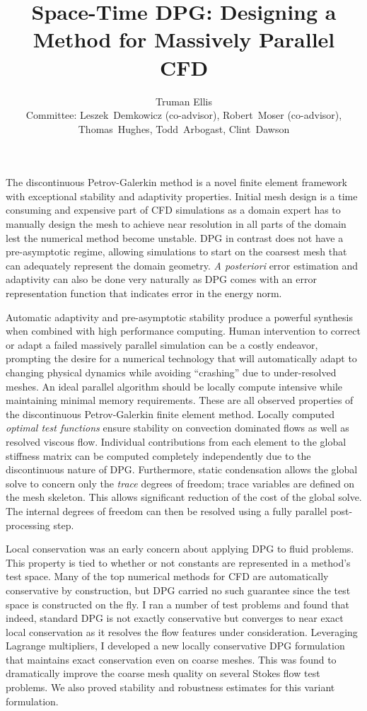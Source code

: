 \documentclass[letterpaper]{article}
\title{Space-Time DPG: Designing a Method for Massively Parallel CFD}
\author{Truman Ellis\\
Committee: Leszek~Demkowicz (co-advisor), Robert~Moser (co-advisor), Thomas~Hughes, Todd~Arbogast, Clint~Dawson}
\date{}
\begin{document}
\maketitle

The discontinuous Petrov-Galerkin method\cite{DPGOverview} is a novel finite element framework with exceptional stability and adaptivity properties.
Initial mesh design is a time consuming and expensive part of CFD simulations as a domain expert has to manually design the 
mesh to achieve near resolution in all parts of the domain lest the numerical method become unstable.
DPG in contrast does not have a pre-asymptotic regime, allowing simulations to start on the coarsest mesh that can adequately represent the domain geometry.
\emph{A posteriori} error estimation and adaptivity can also be done very naturally as DPG comes with an error representation function 
that indicates error in the energy norm.

Automatic adaptivity and pre-asymptotic stability produce a powerful synthesis when combined with high performance computing.
Human intervention to correct or adapt a failed massively parallel simulation can be a costly endeavor, prompting the desire for a
numerical technology that will automatically adapt to changing physical dynamics while avoiding ``crashing'' due to under-resolved meshes.
An ideal parallel algorithm should be locally compute intensive while maintaining minimal memory requirements\cite{BlastWebPage}.
These are all observed properties of the discontinuous Petrov-Galerkin finite element method.
Locally computed \emph{optimal test functions} ensure stability on convection dominated flows as well as resolved viscous flow.
Individual contributions from each element to the global stiffness matrix can be computed completely independently due to the discontinuous nature of DPG.
Furthermore, static condensation allows the global solve to concern only the \emph{trace} degrees of freedom; 
trace variables are defined on the mesh skeleton.  
This allows significant reduction of the cost of the global solve.  
The internal degrees of freedom can then be resolved using a fully parallel post-processing step.

Local conservation was an early concern about applying DPG to fluid problems. 
This property is tied to whether or not constants are represented in a method's test space.
Many of the top numerical methods for CFD are automatically conservative by construction, 
but DPG carried no such guarantee since the test space is constructed on the fly.
I ran a number of test problems and found that indeed, standard DPG is not exactly conservative but converges to near exact local conservation 
as it resolves the flow features under consideration.
Leveraging Lagrange multipliers, I developed a new locally conservative DPG formulation\cite{Ellis2014} 
that maintains exact conservation even on coarse meshes.
This was found to dramatically improve the coarse mesh quality on several Stokes flow test problems.
We also proved stability and robustness estimates for this variant formulation.
\end{document}

